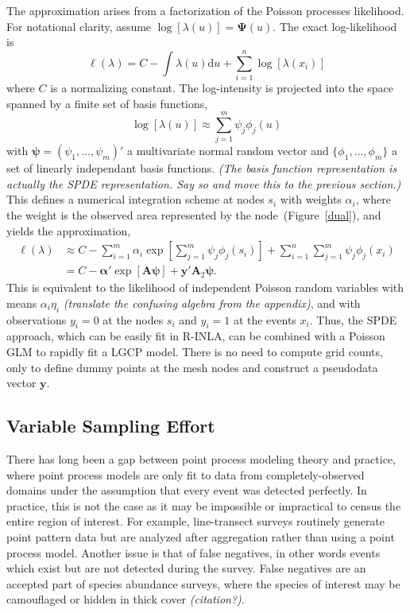 \documentclass[]{interact}
\begin{document}
The approximation arises from a factorization of the Poisson processes
likelihood. For notational clarity, assume \(\log[\lambda(u)]
= \boldsymbol{\Psi}(u)\). The exact log-likelihood is
\begin{displaymath}
\ell(\lambda) = C - \int \lambda(u) \mathrm{d}u
+ \sum_{i = 1}^{n} \log\left[\lambda(x_{i})\right]
\end{displaymath}
where \(C\) is a normalizing constant. The log-intensity is projected into the
space spanned by a finite set of basis functions,
\begin{displaymath}
\log\left[\lambda(u)\right]
\approx \sum_{j = 1}^{m} \psi_{j} \phi_{j}(u)
\end{displaymath}
with \(\boldsymbol{\psi} = (\psi_{1}, \dots, \psi_{m})'\) a multivariate
normal random vector and \(\{\phi_{1}, \dots, \phi_{m}\}\) a set of linearly
independant basis functions.
{\it (The basis function representation is actually the SPDE representation.
Say so and move this to the previous section.)}
This defines a numerical integration scheme at nodes \(s_{i}\)
with weights \(\alpha_{i}\), where the weight is the observed area represented
by the node~(Figure~\ref{dual}), and yields the approximation,
\begin{align*}
\ell(\lambda) &\approx C - \sum_{i = 1}^{m} \alpha_{i}
\exp\left[\sum_{j = 1}^{m} \psi_{j}\phi_{j}(s_{i})\right]
+ \sum_{i = 1}^{n} \sum_{j = 1}^{m} \psi_{j}\phi_{j}(x_{i}) \\
& = C - \boldsymbol{\alpha}'
\exp\left[\mathbf{A} \boldsymbol{\psi}\right]
+ \mathbf{y}' \mathbf{A}_{2} \boldsymbol{\psi}.
\end{align*}
This is equivalent to the likelihood of independent Poisson random variables
with means \(\alpha_{i} \eta_{i}\) {\it (translate the confusing algebra from
the appendix)}, and with observations \(y_{i} = 0\) at the nodes \(s_{i}\) and
\(y_{i} = 1\) at the events \(x_{i}\). Thus, the SPDE approach, which can be
easily fit in R-INLA, can be combined with a Poisson GLM to rapidly fit a LGCP
model. There is no need to compute grid counts, only to define dummy points at
the mesh nodes and construct a pseudodata vector \(\mathbf{y}\).


\subsection{Variable Sampling Effort}
\label{veffort}

There has long been a gap between point process modeling theory and practice,
where point process models are only fit to data from completely-observed
domains under the assumption that every event was detected perfectly. In
practice, this is not the case as it may be impossible or impractical to census
the entire region of interest. For example, line-transect surveys routinely
generate point pattern data but are analyzed after aggregation rather than
using a point process model. Another issue is that of false negatives, in other
words events which exist but are not detected during the survey. False
negatives are an accepted part of species abundance surveys, where the species
of interest may be camouflaged or hidden in thick cover {\it (citation?)}.
\end{document}
